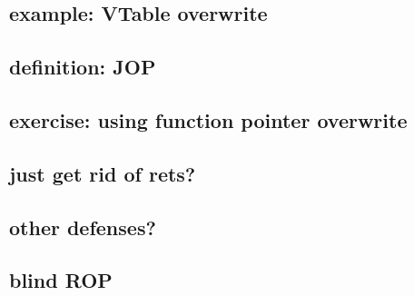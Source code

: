 \subsection{example: VTable overwrite}



\subsection{definition: JOP}



\subsection{exercise: using function pointer overwrite}


\subsection{just get rid of rets?}


\subsection{other defenses?}


\subsection{blind ROP}

